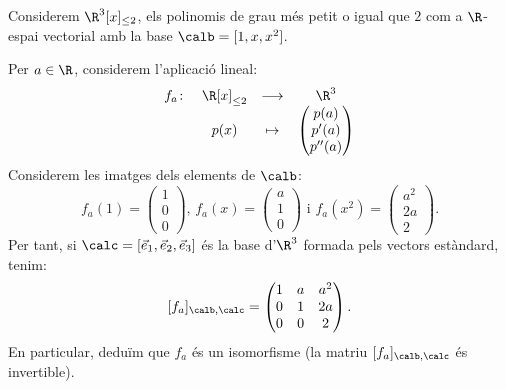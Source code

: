 \begin{exemple}
Considerem $\R^3[x]_{\leq2}$, els polinomis de grau més petit o igual que $2$ com a $\R$-espai vectorial amb la base $\calb=[1,x,x^2]$.

Per $a\in \R$, considerem l'aplicació lineal:
$$
\begin{array}{cccc}
f_a\colon & \R[x]_{\leq2} & \longrightarrow & \R^3 \\
 & p(x) & \mapsto & \begin{pmatrix} p(a) \\ p'(a) \\ p''(a) \end{pmatrix}
\end{array}
$$
Considerem les imatges dels elements de $\calb$:
$$
f_a(1)=\begin{pmatrix} 1 \\ 0 \\ 0 \end{pmatrix}
\text{, }
f_a(x)=\begin{pmatrix} a \\ 1 \\ 0 \end{pmatrix}
\text{ i }
f_a(x^2)=\begin{pmatrix} a^2 \\ 2a \\ 2 \end{pmatrix}.
$$
Per tant, si $\calc=[\vec e_1, \vec e_2, \vec e_3]$ és la base d'$\R^3$ formada pels vectors estàndard, tenim:
$$
[f_a]_{\calb,\calc}=\begin{pmatrix} 1 & a & a^2 \\ 0 & 1 & 2a \\ 0 & 0 & 2\end{pmatrix}.
$$
En particular, deduïm que $f_a$ és un isomorfisme (la matriu $[f_a]_{\calb,\calc}$ és invertible).


\end{exemple}
